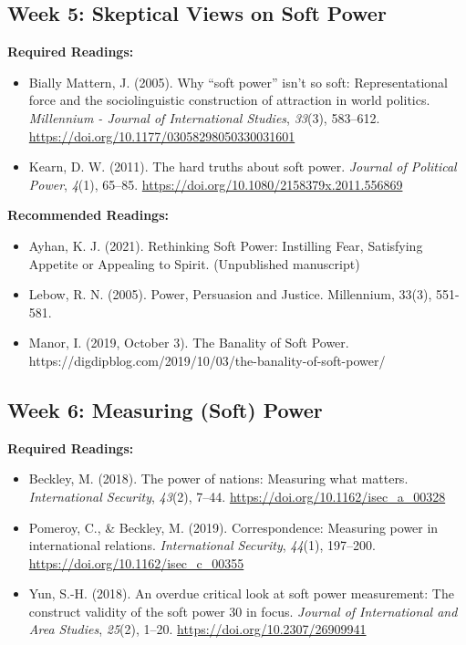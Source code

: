 \documentclass[
  letterpaper,
  DIV=11,
  numbers=noendperiod]{scrartcl}
\providecommand{\tightlist}{%
  \setlength{\itemsep}{0pt}\setlength{\parskip}{0pt}}\usepackage{longtable,booktabs,array}
\begin{document}
\hypertarget{week-5-skeptical-views-on-soft-power}{%
\subsection*{Week 5: Skeptical Views on Soft
Power}\label{week-5-skeptical-views-on-soft-power}}

\textbf{Required Readings:}

\begin{itemize}
\tightlist
\item
  Bially Mattern, J. (2005). Why {``soft power''} isn't so soft:
  Representational force and the sociolinguistic construction of
  attraction in world politics. \emph{Millennium - Journal of
  International Studies}, \emph{33}(3), 583--612.
  \url{https://doi.org/10.1177/03058298050330031601}
\item
  Kearn, D. W. (2011). The hard truths about soft power. \emph{Journal
  of Political Power}, \emph{4}(1), 65--85.
  \url{https://doi.org/10.1080/2158379x.2011.556869}
\end{itemize}

\textbf{Recommended Readings:}

\begin{itemize}
\tightlist
\item
  Ayhan, K. J. (2021). Rethinking Soft Power: Instilling Fear,
  Satisfying Appetite or Appealing to Spirit. (Unpublished manuscript)
\item
  Lebow, R. N. (2005). Power, Persuasion and Justice. Millennium, 33(3),
  551-581.
\item
  Manor, I. (2019, October 3). The Banality of Soft Power.
  https://digdipblog.com/2019/10/03/the-banality-of-soft-power/
\end{itemize}

\hypertarget{week-6-measuring-soft-power}{%
\subsection*{Week 6: Measuring (Soft)
Power}\label{week-6-measuring-soft-power}}

\textbf{Required Readings:}

\begin{itemize}
\tightlist
\item
  Beckley, M. (2018). The power of nations: Measuring what matters.
  \emph{International Security}, \emph{43}(2), 7--44.
  \url{https://doi.org/10.1162/isec_a_00328}
\item
  Pomeroy, C., \& Beckley, M. (2019). Correspondence: Measuring power in
  international relations. \emph{International Security}, \emph{44}(1),
  197--200. \url{https://doi.org/10.1162/isec_c_00355}
\item
  Yun, S.-H. (2018). An overdue critical look at soft power measurement:
  The construct validity of the soft power 30 in focus. \emph{Journal of
  International and Area Studies}, \emph{25}(2), 1--20.
  \url{https://doi.org/10.2307/26909941}
\end{itemize}
\end{document}
